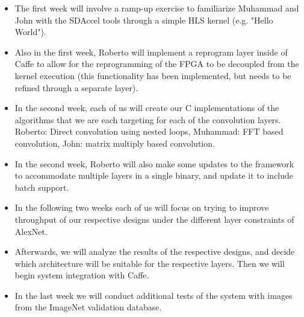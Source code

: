 \documentclass[conference,compsoc]{IEEEtran/IEEEtran}
\begin{document}
\begin{itemize}
    \item The first week will involve a ramp-up exercise to familiarize Muhammad and John with
	the SDAccel tools through a simple HLS kernel (e.g. "Hello World").
    \item Also in the first week, Roberto will implement a reprogram layer inside of Caffe to
	allow for the reprogramming of the FPGA to be decoupled from the kernel execution
	(this functionality has been implemented, but needs to be refined through a separate layer).
    \item In the second week, each of us will create our C implementations of the algorithms
	that we are each targeting for each of the convolution layers. Roberto: Direct convolution
	using nested loops, Muhammad: FFT based convolution, John: matrix multiply based convolution.
	\item In the second week, Roberto will also make some updates to the framework to accommodate
	multiple layers in a single binary, and update it to include batch support.
    \item In the following two weeks each of us will focus on trying to improve throughput of our
	respective designs under the different layer constraints of AlexNet.
    \item Afterwards, we will analyze the results of the respective designs, and decide which
	architecture will be suitable for the respective layers. Then we will begin system integration
	with Caffe.
    \item In the last week we will conduct additional tests of the system with images from the
	ImageNet validation database.
\end{itemize}




\end{document}
